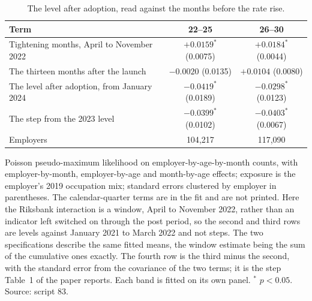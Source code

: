 \begin{table}[ht!]
\centering
\caption{The level after adoption, read against the months before the rate rise.}
\label{tab:window}
\footnotesize
\begin{tabular}{@{}lcc@{}}
\toprule
Term & 22--25 & 26--30 \\
\midrule
Tightening months, April to November 2022 & $+0.0159^{*}$ (0.0075) & $+0.0184^{*}$ (0.0044) \\
The thirteen months after the launch & $-0.0020$ (0.0135) & $+0.0104$ (0.0080) \\
The level after adoption, from January 2024 & $-0.0419^{*}$ (0.0189) & $-0.0298^{*}$ (0.0123) \\
The step from the 2023 level & $-0.0399^{*}$ (0.0102) & $-0.0403^{*}$ (0.0067) \\
Employers & 104{,}217 & 117{,}090 \\
\bottomrule
\end{tabular}
\begin{minipage}{0.88\textwidth}\footnotesize\vspace{4pt}
Poisson pseudo-maximum likelihood on employer-by-age-by-month counts, with employer-by-month, employer-by-age and month-by-age effects; exposure is the employer's 2019 occupation mix; standard errors clustered by employer in parentheses. The calendar-quarter terms are in the fit and are not printed. Here the Riksbank interaction is a window, April to November 2022, rather than an indicator left switched on through the post period, so the second and third rows are levels against January 2021 to March 2022 and not steps. The two specifications describe the same fitted means, the window estimate being the sum of the cumulative ones exactly. The fourth row is the third minus the second, with the standard error from the covariance of the two terms; it is the step Table~1 of the paper reports. Each band is fitted on its own panel. $^{*}$ $p<0.05$. Source: script 83.
\end{minipage}
\end{table}
